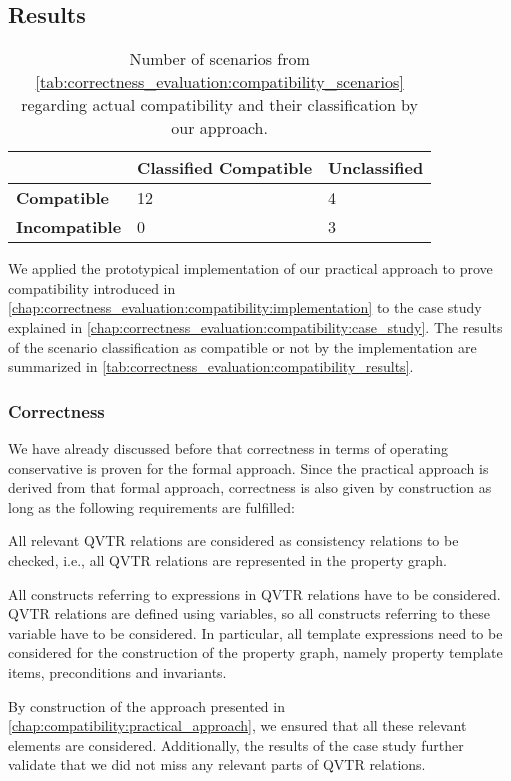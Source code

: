 \subsection{Results}

\begin{table}
    \centering
    \small
    \renewcommand{\arraystretch}{1.2}%
    \setlength\tabcolsep{4 pt}
    \begin{tabular}{L{2cm} C{3.5cm} C{2.3cm}}
        \toprule
         & \textbf{Classified Compatible} & \textbf{Unclassified} \\
         \midrule
         \textbf{Compatible} & 12 & 4\\
         \textbf{Incompatible} & 0 & 3\\
         \bottomrule
    \end{tabular}
    \caption[Correctness of compatibility classification results]{Number of scenarios from \autoref{tab:correctness_evaluation:compatibility_scenarios} regarding actual compatibility and their classification by our approach.}
    \label{tab:correctness_evaluation:compatibility_results}
\end{table}

We applied the prototypical implementation of our practical approach to prove compatibility introduced in \autoref{chap:correctness_evaluation:compatibility:implementation} to the case study explained in \autoref{chap:correctness_evaluation:compatibility:case_study}.
The results of the scenario classification as compatible or not by the implementation are summarized in \autoref{tab:correctness_evaluation:compatibility_results}.


\subsubsection{Correctness}

We have already discussed before that correctness in terms of operating conservative is proven for the formal approach.
Since the practical approach is derived from that formal approach, correctness is also given by construction as long as the following requirements are fulfilled:
\begin{properenumerate}
    \item All relevant \gls{QVTR} relations are considered as consistency relations to be checked, i.e., all \gls{QVTR} relations are represented in the property graph.
    \item All constructs referring to expressions in \gls{QVTR} relations have to be considered. \gls{QVTR} relations are defined using variables, so all constructs referring to these variable have to be considered. In particular, all template expressions need to be considered for the construction of the property graph, namely property template items, preconditions and invariants.
\end{properenumerate}
By construction of the approach presented in \autoref{chap:compatibility:practical_approach}, we ensured that all these relevant elements are considered.
Additionally, the results of the case study further validate that we did not miss any relevant parts of \gls{QVTR} relations.

